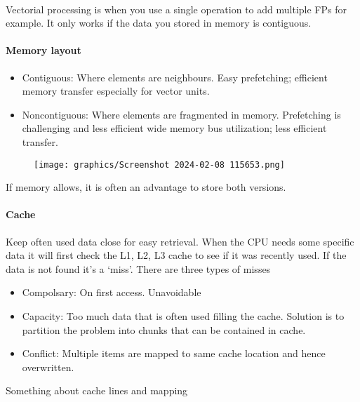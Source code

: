 \documentclass{article}
\begin{document}
\paragraph*{} Vectorial processing is when you use a single operation to add multiple FPs for example. It only works if the data you stored in memory is contiguous.


\paragraph*{Memory layout}
\begin{itemize}
    \item Contiguous: Where elements are neighbours. Easy prefetching; efficient memory transfer especially for vector units.
    \item Noncontiguous: Where elements are fragmented in memory. Prefetching is challenging and less efficient wide memory bus utilization; less efficient transfer. 
\end{itemize}
\begin{figure}[h]
    \texttt{[image: graphics/Screenshot 2024-02-08 115653.png]}
\end{figure}

If memory allows, it is often an advantage to store both versions.
\paragraph*{Cache}
Keep often used data close for easy retrieval. When the CPU needs some specific data it will first check the L1, L2, L3 cache to see if it was recently used. If the data is not found it's a `miss'. There are three types of misses
\begin{itemize}
    \item Compolsary: On first access. Unavoidable
    \item Capacity: Too much data that is often used filling the cache. Solution is to partition the problem into chunks that can be contained in cache.
    \item Conflict: Multiple items are mapped to same cache location and hence overwritten.
\end{itemize}

Something about cache lines and mapping 
\end{document}
